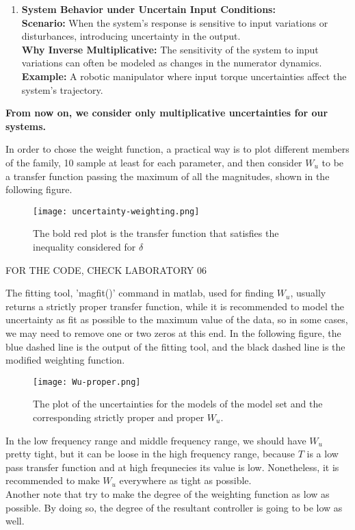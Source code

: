 \begin{enumerate}
    \item \textbf{System Behavior under Uncertain Input Conditions:}\\
    \textbf{Scenario:} When the system’s response is sensitive to input variations or disturbances, introducing uncertainty in the output.\\
    \textbf{Why Inverse Multiplicative:} The sensitivity of the system to input variations can often be modeled as changes in the numerator dynamics.\\
    \textbf{Example:} A robotic manipulator where input torque uncertainties affect the system’s trajectory.
\end{enumerate}

\textbf{From now on, we consider only multiplicative uncertainties for our systems.}

In order to chose the weight function, a practical way is to plot different members of the family, 10 sample at least for each parameter, and then consider $W_u$ to be a transfer function passing the maximum of all the magnitudes, shown in the following figure.
\begin{figure}[H]
    \centering
    \texttt{[image: uncertainty-weighting.png]}
    \caption{The bold red plot is the transfer function that satisfies the inequality considered for $\delta$}
\end{figure}
FOR THE CODE, CHECK LABORATORY 06

The fitting tool, 'magfit()' command in matlab, used for finding $W_u$, usually returns a strictly proper transfer function, while it is recommended to model the uncertainty as fit as possible to the maximum value of the data, so in some cases, we may need to remove one or two zeros at this end. In the following figure, the blue dashed line is the output of the fitting tool, and the black dashed line is the modified weighting function.

\begin{figure}[H]
    \centering
    \texttt{[image: Wu-proper.png]}
    \caption{The plot of the uncertainties for the models of the model set and the corresponding strictly proper and proper $W_u$.}
\end{figure}

\begin{factbox}
In the low frequency range and middle frequency range, we should have $W_u$ pretty tight, but it can be loose in the high frequency range, because $T$ is a low pass transfer function and at high frequnecies its value is low. Nonetheless, it is recommended to make $W_u$ everywhere as tight as possible.\\
Another note that try to make the degree of the weighting function as low as possible. By doing so, the degree of the resultant controller is going to be low as well.
\end{factbox}

